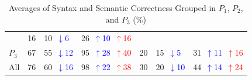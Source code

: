 \begin{table}
\begin{tabularx}{\textwidth}{l X X X X X X}
& 16 
& 10~\textcolor{blue}{\scriptsize$\downarrow$6}   
& 26~\textcolor{blue}{\scriptsize$\uparrow$10}~\textcolor{red}{\scriptsize$\uparrow$16} \\
$P_3$ 
& 67 
& 55~\textcolor{blue}{\scriptsize$\downarrow$12}   
& 95~\textcolor{blue}{\scriptsize$\uparrow$28}~\textcolor{red}{\scriptsize$\uparrow$40}
& 20 
& 15~\textcolor{blue}{\scriptsize$\downarrow$5}   
& 31~\textcolor{blue}{\scriptsize$\uparrow$11}~\textcolor{red}{\scriptsize$\uparrow$16} \\
All 
& 76 
& 60~\textcolor{blue}{\scriptsize$\downarrow$16}   
& 98~\textcolor{blue}{\scriptsize$\uparrow$22}~\textcolor{red}{\scriptsize$\uparrow$38}
& 30 
& 20~\textcolor{blue}{\scriptsize$\downarrow$10}   
& 44~\textcolor{blue}{\scriptsize$\uparrow$14}~\textcolor{red}{\scriptsize$\uparrow$24} \\
\bottomrule
\end{tabularx}
\caption{Averages of Syntax and Semantic Correctness Grouped in $P_1$, $P_2$, and $P_3$ (\%)}
\label{tab:prs_results}
\end{table}



